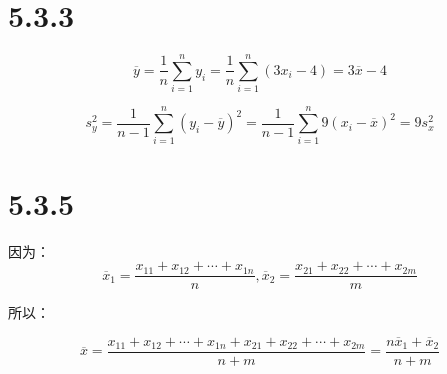 \documentclass{article}
\begin{document}




\section{5.3.3}

$$\overline y=\frac1n\sum^{n}_{i=1}y_i=\frac1n\sum^{n}_{i=1}(3x_i-4)=3\overline x -4$$

$$s^2_y=\frac{1}{n-1}\sum^{n}_{i=1}(y_i-\overline y)^2=\frac{1}{n-1}\sum^{n}_{i=1}9(x_i-\overline x)^2=9s_x^2$$
\section{5.3.5}

因为：
$$\overline x_1 = \frac{x_{11}+x_{12}+\cdots+x_{1n}}{n},\overline x_2=\frac{x_{21}+x_{22}+\cdots+x_{2m}}{m}$$

所以：

$$\overline x = \frac{x_{11}+x_{12}+\cdots+x_{1n}+x_{21}+x_{22}+\cdots+x_{2m}}{n+m}=\frac{n\overline x_1+ \overline x_2}{n+m}$$
\end{document}
